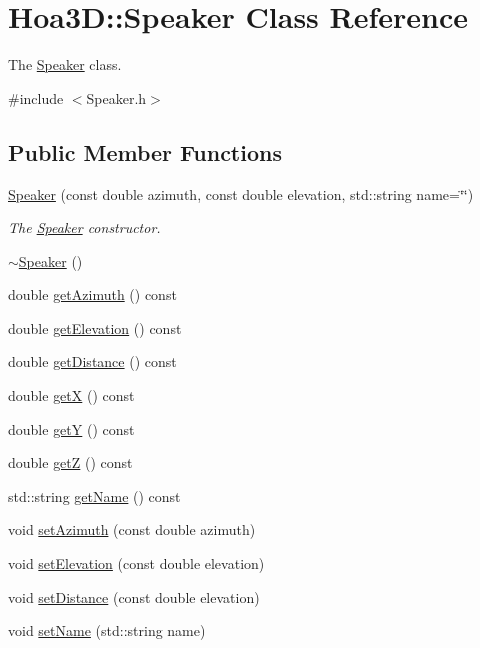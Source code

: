 \hypertarget{class_hoa3_d_1_1_speaker}{\section{Hoa3\-D\-:\-:Speaker Class Reference}
\label{class_hoa3_d_1_1_speaker}
}


The \hyperlink{class_hoa3_d_1_1_speaker}{Speaker} class.  




{\ttfamily \#include $<$Speaker.\-h$>$}

\subsection*{Public Member Functions}
\begin{DoxyCompactItemize}
\item 
\hyperlink{class_hoa3_d_1_1_speaker_a28d1a9ddf4cc7885c5dcf844187de075}{Speaker} (const double azimuth, const double elevation, std\-::string name=\char`\"{}\char`\"{})
\begin{DoxyCompactList}\small\item\em The \hyperlink{class_hoa3_d_1_1_speaker}{Speaker} constructor. \end{DoxyCompactList}\item 
\hyperlink{class_hoa3_d_1_1_speaker_ac3756536583f2dde4525b6bf243a43f6}{$\sim$\-Speaker} ()
\item 
double \hyperlink{class_hoa3_d_1_1_speaker_a73899e5b29ad773c4090421f5ee9860d}{get\-Azimuth} () const 
\item 
double \hyperlink{class_hoa3_d_1_1_speaker_a86be1923b75fe28da717bdd5198c6e64}{get\-Elevation} () const 
\item 
double \hyperlink{class_hoa3_d_1_1_speaker_ad403cd7b0bc648d44c61dc41d6938747}{get\-Distance} () const 
\item 
double \hyperlink{class_hoa3_d_1_1_speaker_adb905b72d771802ca7d984b3269fedbe}{get\-X} () const 
\item 
double \hyperlink{class_hoa3_d_1_1_speaker_a430cd6ebc1dd4de387dbb8af7a814cd9}{get\-Y} () const 
\item 
double \hyperlink{class_hoa3_d_1_1_speaker_ad6916bedbeb08169fa22a8fe5ca6caa8}{get\-Z} () const 
\item 
std\-::string \hyperlink{class_hoa3_d_1_1_speaker_a9498121d97ebc26ace05f8dcdb239af0}{get\-Name} () const 
\item 
void \hyperlink{class_hoa3_d_1_1_speaker_a7d4ee6aba3f11c2cfc72dfd735d1369c}{set\-Azimuth} (const double azimuth)
\item 
void \hyperlink{class_hoa3_d_1_1_speaker_ab70343c3bee6345efa8f072710231dca}{set\-Elevation} (const double elevation)
\item 
void \hyperlink{class_hoa3_d_1_1_speaker_a4698a8b00f20a1dad05e18b8ec6d402c}{set\-Distance} (const double elevation)
\item 
void \hyperlink{class_hoa3_d_1_1_speaker_a1ec753918cc6859f81da50ba650518eb}{set\-Name} (std\-::string name)
\end{DoxyCompactItemize}


